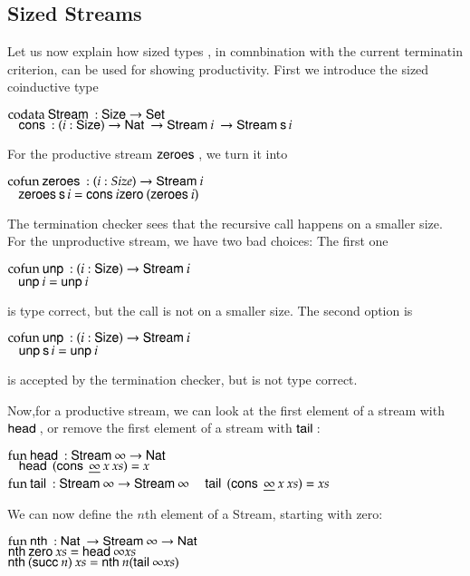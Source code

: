 \subsection{Sized Streams}
Let us now explain how sized types , in comnbination with the current terminatin criterion, can be used for showing productivity.
First we introduce the sized coinductive type 
\begin{bsp}
$\mathrm{codata}\: \mathsf{Stream}\: : \mathsf{Size} \rightarrow \mathsf{Set} $ \\
$\hspace*{3mm} \mathsf{cons}\: : ( i : \mathsf{Size} ) \rightarrow{\mathsf{Nat}\:\rightarrow\mathsf{Stream}\:i \: \rightarrow\mathsf{Stream}\:\mathsf{s}\,i } $
\end{bsp}
For the productive stream $\mathsf{zeroes}\:$, we turn it into
\begin{bsp}
$\mathrm{cofun}\: \mathsf{zeroes}\:: ( i : Size ) \rightarrow{\mathsf{Stream}\:i} $ \\
$\hspace*{3mm} \mathsf{zeroes}\: \mathsf{s}\, i = \mathsf{cons}\: i \mathsf{zero}\: (\mathsf{zeroes}\: i)$\\
\end{bsp}
The termination checker sees that the recursive call happens on a smaller size.
For the unproductive stream, we have two bad choices:
The first one
\begin{bsp}
$\mathrm{cofun}\: \mathsf{unp}\: : ( i : \mathsf{Size} ) \rightarrow{\mathsf{Stream}\:i}$ \\
$\hspace*{3mm} \mathsf{unp}\: i =  \mathsf{unp}\: i$
\end{bsp}
is type correct, but the call is not on a smaller size.
The second option is
\begin{bsp}
$\mathrm{cofun}\: \mathsf{unp}\: : ( i : \mathsf{Size} ) \rightarrow{\mathsf{Stream}\:i}$ \\
$\hspace*{3mm} \mathsf{unp}\: \mathsf{s}\, i = \mathsf{unp}\: i $
\end{bsp}
is accepted by the termination checker, but is not type correct.

Now,for a productive stream, we can look at the first element of a stream with $\mathsf{head}\:$, or remove the first element of a stream with $\mathsf{tail}\:$:
\begin{bsp}
$\mathrm{fun}\: \mathsf{head}\: : \mathsf{Stream}\: \infty \rightarrow \mathsf{Nat}\:$\\
$\hspace*{3mm} \mathsf{head}\: \: (\mathsf{cons}\: \: \underline{\infty} \: x \: xs) = x$
\vs\\
$\mathrm{fun}\: \mathsf{tail}\: :  \mathsf{Stream}\: \infty \rightarrow \mathsf{Stream}\: \infty $
$\hspace*{3mm} \mathsf{tail}\: \: (\mathsf{cons}\: \: \underline{\infty} \: x \: xs) = xs$\\
\end{bsp}
We can now define the $n$th element of a Stream, starting with zero:
\begin{bsp}
$\mathrm{fun}\: \mathsf{nth}\: : \mathsf{Nat}\: \rightarrow \mathsf{Stream}\: \infty \rightarrow \mathsf{Nat}\:$\\
$\mathsf{nth}\: \mathsf{zero}\: xs = \mathsf{head}\: \infty xs$\\
$\mathsf{nth}\: (\mathsf{succ}\: n) \: xs = \mathsf{nth}\: n (\mathsf{tail}\: \infty xs)$\\
\end{bsp}
